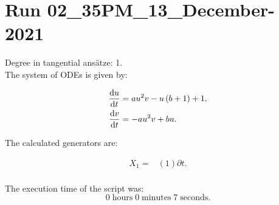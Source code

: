 \section*{Run 02\_35PM\_13\_December-2021}
Degree in tangential ansätze:	1.\\
The system of ODEs is given by:

\begin{align*}
\dv{u}{t}&=a u^{2} v - u \left(b + 1\right) + 1,\\
\dv{v}{t}&=- a u^{2} v + b u.\\
\end{align*}

\noindent The calculated generators are:

\begin{align*}
X_{1}=&\left(1 \right)\partial t.\\
\end{align*}

\noindent The execution time of the script was:
$$0\;\mathrm{hours}\;0\;\mathrm{minutes}\;7 \;\mathrm{seconds}.$$
